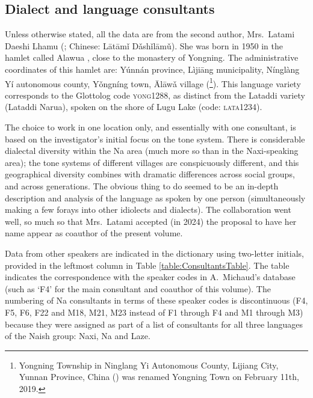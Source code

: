 \subsection{Dialect and language consultants}

Unless otherwise stated, all the data are from the second author, Mrs.\ Latami Daeshi Lhamu (; Chinese:  Lātāmǐ Dǎshǐlāmǔ). She was born in 1950 in the hamlet called Alawua , close to the monastery of Yongning. The administrative coordinates of this hamlet are: Yúnnán province, Lìjiāng municipality, Nínglàng Yí autonomous county, Yǒngníng town, Ālāwǎ village (\footnote{Yongning Township in Ninglang Yi Autonomous County, Lijiang City, Yunnan Province, China () was renamed Yongning Town  on February 11th, 2019.}). This language variety corresponds to the Glottolog code \textsc{yong1288}, as distinct from the Lataddi variety (Lataddi Narua), spoken on the shore of Lugu Lake (code: \textsc{lata1234}).

The choice to work in one location only, and essentially with one consultant, is based on the investigator’s initial focus on the tone system. There is considerable dialectal diversity within the Na area (much more so than in the Naxi-speaking area); the tone systems of different villages are conspicuously different, and this geographical diversity combines with dramatic differences across social groups, and across generations. The obvious thing to do seemed to be an in-depth description and analysis of the language as spoken by one person (simultaneously making a few forays into other idiolects and dialects). The collaboration went well, so much so that Mrs.\ Latami accepted (in 2024) the proposal to have her name appear as coauthor of the present volume.

Data from other speakers are indicated in the dictionary using two-letter initials, provided in the leftmost column in Table \ref{table:ConsultantsTable}. The table indicates the correspondence with the speaker codes in A.\ Michaud's database (such as `F4' for the main consultant and coauthor of this volume). The numbering of Na consultants in terms of these speaker codes is discontinuous (F4, F5, F6, F22 and M18, M21, M23 instead of F1 through F4 and M1 through M3) because they were assigned as part of a list of consultants for all three languages of the Naish group: Naxi, Na and Laze.

